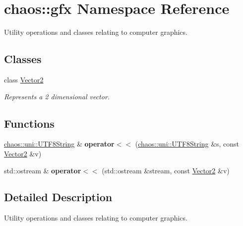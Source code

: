 \hypertarget{namespacechaos_1_1gfx}{\section{chaos\-:\-:gfx Namespace Reference}
\label{namespacechaos_1_1gfx}
}


Utility operations and classes relating to computer graphics.  


\subsection*{Classes}
\begin{DoxyCompactItemize}
\item 
class \hyperlink{classchaos_1_1gfx_1_1_vector2}{Vector2}
\begin{DoxyCompactList}\small\item\em Represents a 2 dimensional vector. \end{DoxyCompactList}\end{DoxyCompactItemize}
\subsection*{Functions}
\begin{DoxyCompactItemize}
\item 
\hypertarget{namespacechaos_1_1gfx_a1de33c2369485b21d55cb0b17551c175}{\hyperlink{classchaos_1_1uni_1_1_u_t_f8_string}{chaos\-::uni\-::\-U\-T\-F8\-String} \& {\bfseries operator$<$$<$} (\hyperlink{classchaos_1_1uni_1_1_u_t_f8_string}{chaos\-::uni\-::\-U\-T\-F8\-String} \&s, const \hyperlink{classchaos_1_1gfx_1_1_vector2}{Vector2} \&v)}\label{namespacechaos_1_1gfx_a1de33c2369485b21d55cb0b17551c175}

\item 
\hypertarget{namespacechaos_1_1gfx_ab0c024010ee012b4c4083a5457f44fe9}{std\-::ostream \& {\bfseries operator$<$$<$} (std\-::ostream \&stream, const \hyperlink{classchaos_1_1gfx_1_1_vector2}{Vector2} \&v)}\label{namespacechaos_1_1gfx_ab0c024010ee012b4c4083a5457f44fe9}

\end{DoxyCompactItemize}


\subsection{Detailed Description}
Utility operations and classes relating to computer graphics. 